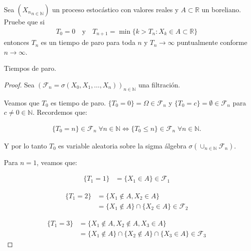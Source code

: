 \begin{problema}
	Sea $\left({X_n}_{n\in\mathbb{N}}\right)$ un proceso estocástico con valores reales y $A\subset \mathbb{R}$ un boreliano. 
	Pruebe que si
	\begin{align}
		T_0=0\quad\text{y}\quad T_{n+1}=\min\{k>T_n: X_k\in A \subset \mathbb{R}\}
	\end{align}
	entonces $T_n$ es un tiempo de paro para toda $n$ y $T_n\to \infty$ puntualmente conforme $n\to\infty$. 

	\begin{categoria} 
		Tiempos de paro.
	\end{categoria}
\end{problema}
\afterstatement		
\begin{proof}\par\null
	Sea $(\mathscr{F}_n = \sigma(  X_0, X_1, \dots, X_n ))_{ n \in \mathbb{N}}$ una filtración.\par\null

	Veamos que $T_0$ es tiempo de paro. $\{T_0 = 0\} = \Omega \in \mathscr{F}_n$ y 
	$\{T_0 = c\} = \emptyset \in \mathscr{F}_n$ para $c \not= 0 \in \mathbb{N}$. Recordemos que:		
	
    \begin{align}\label{problema_1_1:equivalencia_varable_aleatoria}
		\{T_0 = n\} \in \mathscr{F}_n \; \forall n \in \mathbb{N} \iff 
		\{T_0 \leq n\} \in \mathscr{F}_n \; \forall n \in \mathbb{N}.
	\end{align}\par\null
	
    Y por lo tanto $T_0$ es variable aleatoria sobre la sigma álgebra $\sigma(\cup_{n \in \mathbb{N}} 
	\mathscr{F}_n)$.\par\null

	Para $n=1$, veamos que:
 
	\begin{align}
			\{T_1 = 1\}     &= \{ X_1 \in A \}	\in \mathscr{F}_1 
	\end{align}
	
	\begin{align}
			\{T_1 = 2\} 	&= 	\{ X_1 \not\in A, X_2 \in A \} \\
							&= 	\{ X_1 \not\in A \} \cap \{X_2 \in A \} \in \mathscr{F}_2	
	\end{align}
	
	\begin{align}
			\{T_1 = 3\} 	&=	\{ X_1 \not\in A, X_2 \not\in A,  X_3 \in A \} \\ 
							&= 	\{ X_1 \not\in A \} \cap \{ X_2 \not\in A \} \cap \{X_3 \in A \} \in \mathscr{F}_3
	\end{align}
	

\end{proof}
